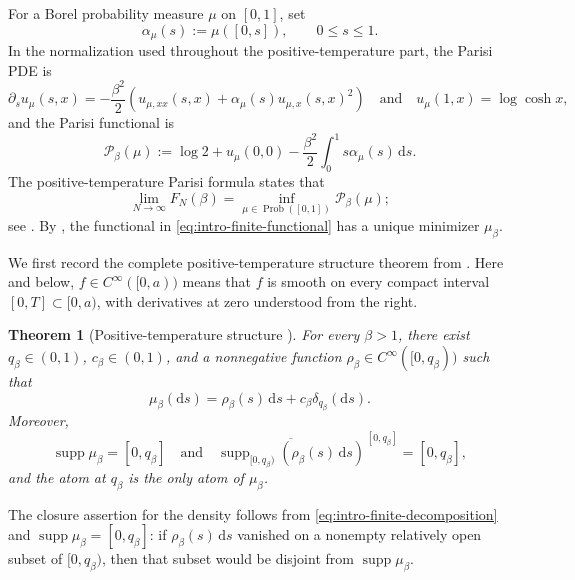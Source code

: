 \documentclass[10pt]{amsart}
\newtheorem{theorem}{Theorem}[section]
\theoremstyle{definition}
\theoremstyle{remark}
\numberwithin{equation}{section}
\newcommand{\1}{\mathbf 1}
\newcommand{\supp}{\operatorname{supp}}
\newcommand{\dd}{\,\mathrm d}
\begin{document}
For a Borel probability measure $\mu$ on $[0,1]$, set
\begin{equation*}
\alpha_\mu(s):=\mu([0,s]),
\qquad
0\leq s\leq1.
\end{equation*}
In the normalization used throughout the positive-temperature part, the Parisi PDE is
\begin{equation*}
\partial_su_\mu(s,x)
=-\frac{\beta^2}{2}\left(u_{\mu,xx}(s,x)+\alpha_\mu(s)u_{\mu,x}(s,x)^2\right)
\quad\text{and}\quad
u_\mu(1,x)=\log\cosh x,
\end{equation*}
and the Parisi functional is
\begin{equation}
\mathcal P_\beta(\mu)
:=\log2+u_\mu(0,0)-\frac{\beta^2}{2}\int_0^1s\alpha_\mu(s)\dd s.
\label{eq:intro-finite-functional}
\end{equation}
The positive-temperature Parisi formula states that
\begin{equation*}
 \lim_{N\to\infty}F_N(\beta)
 =\inf_{\mu\in\operatorname{Prob}([0,1])}\mathcal P_\beta(\mu);
\end{equation*}
see \cite[Theorem~1.1]{Talagrand2006}. By \cite[Theorem 1]{AuffingerChenUnique}, the functional in \eqref{eq:intro-finite-functional} has a unique minimizer $\mu_\beta$.

We first record the complete positive-temperature structure theorem from \cite[Theorem~1.1]{Lopatto2026}. Here and below, $f\in C^\infty([0,a))$ means that $f$ is smooth on every compact interval $[0,T]\subset[0,a)$, with derivatives at zero understood from the right.

\begin{theorem}[Positive-temperature structure \cite{Lopatto2026}]
\label{thm:finite-temperature-structure}
For every $\beta>1$, there exist $q_\beta\in(0,1)$, $c_\beta\in(0,1)$, and a nonnegative function $\rho_\beta\in C^\infty([0,q_\beta))$ such that
\begin{equation}
 \mu_\beta(\mathrm d s)=\rho_\beta(s)\dd s+c_\beta\delta_{q_\beta}(\mathrm d s).
 \label{eq:intro-finite-decomposition}
\end{equation}
Moreover,
\begin{equation*}
 \supp\mu_\beta=[0,q_\beta]
 \quad\text{and}\quad
 \overline{\supp_{[0,q_\beta)}(\rho_\beta(s)\dd s)}^{\,[0,q_\beta]}=[0,q_\beta],
\end{equation*}
and the atom at $q_\beta$ is the only atom of $\mu_\beta$.
\end{theorem}

The closure assertion for the density follows from \eqref{eq:intro-finite-decomposition} and $\supp\mu_\beta=[0,q_\beta]$: if $\rho_\beta(s)\dd s$ vanished on a nonempty relatively open subset of $[0,q_\beta)$, then that subset would be disjoint from $\supp\mu_\beta$.
\end{document}
